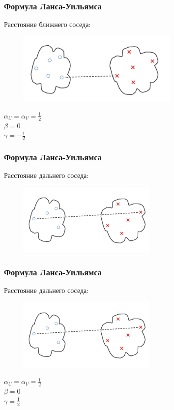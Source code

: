 \documentclass[12pt]{beamer}
\begin{document}
\begin{frame}\frametitle{Формула Ланса-Уильямса}
Расстояние ближнего соседа:\\
\begin{figure}[htbp]
  \includegraphics[height=100pt, keepaspectratio = true]{images/lans1}  
\end{figure}
${\alpha_U = \alpha_V = \frac{1}{2}}$ \\${\beta = 0}$ \\${\gamma = -\frac{1}{2}}$
\end{frame}

\begin{frame}\frametitle{Формула Ланса-Уильямса}
Расстояние дальнего соседа:\\
\begin{figure}[htbp]
  \includegraphics[height=100pt, keepaspectratio = true]{images/lans2}  
\end{figure}
\end{frame}

\begin{frame}\frametitle{Формула Ланса-Уильямса}
Расстояние дальнего соседа:\\
\begin{figure}[htbp]
  \includegraphics[height=100pt, keepaspectratio = true]{images/lans2}  
\end{figure}
${\alpha_U = \alpha_V = \frac{1}{2}}$ \\${\beta = 0}$ \\${\gamma = \frac{1}{2}}$
\end{frame}
\end{document}
